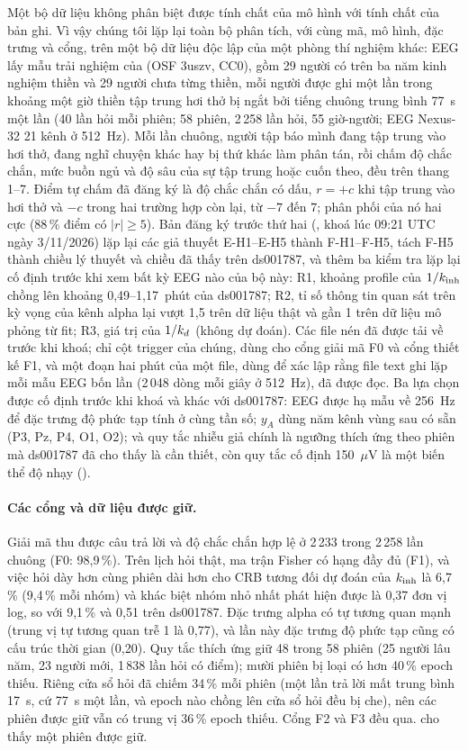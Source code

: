 Một bộ dữ liệu không phân biệt được tính chất của mô hình với tính chất của bản ghi. Vì vậy chúng tôi lặp lại toàn bộ phân tích, với cùng mã, mô hình, đặc trưng và cổng, trên một bộ dữ liệu độc lập của một phòng thí nghiệm khác: EEG lấy mẫu trải nghiệm của \citet{RodriguezLarios2021} (OSF 3uszv, CC0), gồm 29 người có trên ba năm kinh nghiệm thiền và 29 người chưa từng thiền, mỗi người được ghi một lần trong khoảng một giờ thiền tập trung hơi thở bị ngắt bởi tiếng chuông trung bình 77~s một lần (40 lần hỏi mỗi phiên; 58 phiên, 2\,258 lần hỏi, 55 giờ-người; EEG Nexus-32 21 kênh ở 512~Hz). Mỗi lần chuông, người tập báo mình đang tập trung vào hơi thở, đang nghĩ chuyện khác hay bị thứ khác làm phân tán, rồi chấm độ chắc chắn, mức buồn ngủ và độ sâu của sự tập trung hoặc cuốn theo, đều trên thang 1--7. Điểm tự chấm đã đăng ký là độ chắc chắn có dấu, $r=+c$ khi tập trung vào hơi thở và $-c$ trong hai trường hợp còn lại, từ $-7$ đến $7$; phân phối của nó hai cực (88\,\% điểm có $|r|\ge5$). Bản đăng ký trước thứ hai (, khoá lúc 09:21 UTC ngày 3/11/2026) lặp lại các giả thuyết E-H1--E-H5 thành F-H1--F-H5, tách F-H5 thành chiều lý thuyết và chiều đã thấy trên ds001787, và thêm ba kiểm tra lặp lại cố định trước khi xem bất kỳ EEG nào của bộ này: R1, khoảng profile của $1/k_{\mathrm{inh}}$ chồng lên khoảng 0,49--1,17~phút của ds001787; R2, tỉ số thông tin quan sát trên kỳ vọng của kênh alpha lại vượt 1,5 trên dữ liệu thật và gần 1 trên dữ liệu mô phỏng từ fit; R3, giá trị của $1/k_{d}$ (không dự đoán). Các file nén đã được tải về trước khi khoá; chỉ cột trigger của chúng, dùng cho cổng giải mã F0 và cổng thiết kế F1, và một đoạn hai phút của một file, dùng để xác lập rằng file text ghi lặp mỗi mẫu EEG bốn lần (2\,048 dòng mỗi giây ở 512~Hz), đã được đọc. Ba lựa chọn được cố định trước khi khoá và khác với ds001787: EEG được hạ mẫu về 256~Hz để đặc trưng độ phức tạp tính ở cùng tần số; $y_A$ dùng năm kênh vùng sau có sẵn (P3, Pz, P4, O1, O2); và quy tắc nhiễu giả chính là ngưỡng thích ứng theo phiên mà ds001787 đã cho thấy là cần thiết, còn quy tắc cố định 150~$\mu$V là một biến thể độ nhạy ().

\paragraph{Các cổng và dữ liệu được giữ.} Giải mã thu được câu trả lời và độ chắc chắn hợp lệ ở 2\,233 trong 2\,258 lần chuông (F0: 98,9\,\%). Trên lịch hỏi thật, ma trận Fisher có hạng đầy đủ (F1), và việc hỏi dày hơn cùng phiên dài hơn cho CRB tương đối dự đoán của $k_{\mathrm{inh}}$ là 6,7\,\% (9,4\,\% mỗi nhóm) và khác biệt nhóm nhỏ nhất phát hiện được là 0,37 đơn vị log, so với 9,1\,\% và 0,51 trên ds001787. Đặc trưng alpha có tự tương quan mạnh (trung vị tự tương quan trễ 1 là 0,77), và lần này đặc trưng độ phức tạp cũng có cấu trúc thời gian (0,20). Quy tắc thích ứng giữ 48 trong 58 phiên (25 người lâu năm, 23 người mới, 1\,838 lần hỏi có điểm); mười phiên bị loại có hơn 40\,\% epoch thiếu. Riêng cửa sổ hỏi đã chiếm 34\,\% mỗi phiên (một lần trả lời mất trung bình 17~s, cứ 77~s một lần, và epoch nào chồng lên cửa sổ hỏi đều bị che), nên các phiên được giữ vẫn có trung vị 36\,\% epoch thiếu. Cổng F2 và F3 đều qua.  cho thấy một phiên được giữ.


